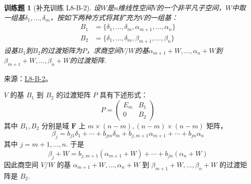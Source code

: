 \documentclass[12pt,fontset=fandol]{ctexart}
\newtheorem{exercise}{训练题}[section]
\begin{document}
\begin{exercise}[补充训练 L8-B-2]\label{prob:L8-B-2}
设$W$是$n$维线性空间$V$的一个非平凡子空间，$W$中取一组基$\delta_1,\ldots,\delta_m$，按如下两种方式将其扩充为$V$的一组基：
        \begin{align*}
            B_1 & =\{\delta_1,\ldots,\delta_m,\alpha_{m+1},\ldots,\alpha_n\} \\
            B_2 & =\{\delta_1,\ldots,\delta_m,\beta_{m+1},\ldots,\beta_n\}
        \end{align*}
        设基$B_1$到$B_2$的过渡矩阵为$P$，求商空间$V/W$的基$\alpha_{m+1}+W,\ldots,\alpha_n+W$到$\beta_{m+1}+W,\ldots,\beta_n+W$的过渡矩阵.
\end{exercise}
\noindent 来源：\href{https://github.com/yhwu-is/Linear-Algebra-Left-Undone/blob/new/%E8%AE%B2%E4%B9%89/%E4%B8%93%E9%A2%98/8%20%E7%9B%B8%E6%8A%B5%E6%A0%87%E5%87%86%E5%BD%A2.tex}{L8-B-2}。
\begin{solve}
$V$ 的基 $B_1$ 到 $B_2$ 的过渡矩阵 $P$ 具有下述形式：
          \[P=\begin{pmatrix}E_m & B_1 \\ 0 & B_2\end{pmatrix}\]
          其中 $B_1,B_2$ 分别是域 $\mathbf{F}$ 上 $m\times (n-m),(n-m)\times (n-m)$ 矩阵，
          \[\beta_j=b_{j1}\delta_1+\cdots+b_{jm}\delta_m+b_{j,m+1}\alpha_{m+1}+\cdots+b_{jn}\alpha_n\]
          其中 $j=m+1,\ldots,n$. 于是
          \[\beta_j+W=b_{j,m+1}(\alpha_{m+1}+W)+\cdots+b_{jn}(\alpha_n+W)\]
          因此商空间 $V/W$ 的基 $\alpha_{m+1}+W,\ldots,\alpha_n+W$ 到 $\beta_{m+1}+W,\ldots,\beta_n+W$ 的过渡矩阵是 $B_2$.
\end{solve}
\end{document}

